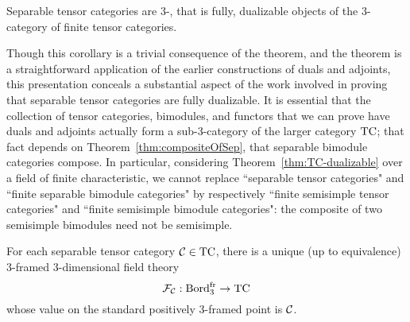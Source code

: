 \documentclass{amsart}
\begin{document}
\begin{corollary} \label{cor:septcisdualizable}
Separable tensor categories are 3-, that is fully, dualizable objects of the 3-category of finite tensor categories.
\end{corollary}

\begin{remark}
Though this corollary is a trivial consequence of the theorem, and the theorem is a straightforward application of the earlier constructions of duals and adjoints, this presentation conceals a substantial aspect of the work involved in proving that separable tensor categories are fully dualizable.  It is essential that the collection of tensor categories, bimodules, and functors that we can prove have duals and adjoints actually form a sub-3-category of the larger category $\mathrm{TC}$; that fact depends on Theorem~\ref{thm:compositeOfSep}, that separable bimodule categories compose.  In particular, considering Theorem~\ref{thm:TC-dualizable} over a field of finite characteristic, we cannot replace ``separable tensor categories" and ``finite separable bimodule categories" by respectively ``finite semisimple tensor categories" and ``finite semisimple bimodule categories": the composite of two semisimple bimodules need not be semisimple.
\end{remark}

\begin{corollary} \label{cor:3dtft}
For each separable tensor category $\mathcal C \in \mathrm{TC}$, there is a unique (up to equivalence) 3-framed 3-dimensional field theory
\[
\mathcal F_\mathcal C : \mathrm{Bord}^\mathrm{fr}_3 \rightarrow \mathrm{TC}
\]
whose value on the standard positively 3-framed point is $\mathcal C$.
\end{corollary}
\end{document}
